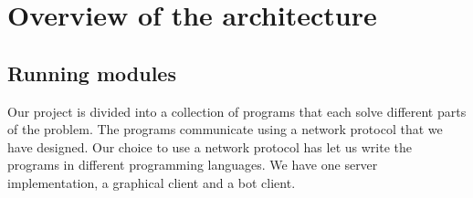 \documentclass[a4paper,11pt]{article}
\begin{document}





\section{Overview of the architecture}
\subsection{Running modules}

Our project is divided into a collection of programs that each solve
different parts of the problem. The programs communicate using a
network protocol that we have designed. Our choice to use a network
protocol has let us write the programs in different programming
languages. We have one server implementation, a graphical client and a
bot client.

\end{document}
